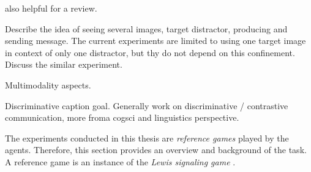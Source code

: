 \cite{lazaridou2018emergence} also helpful for a review.

Describe the idea of seeing several images, target distractor, producing and sending message.
The current experiments are limited to using one target image in context of only one distractor, but thy do not depend on this confinement.
Discuss the similar experiment. 

Multimodality aspects.

Discriminative caption goal. Generally work on discriminative / contrastive communication, more froma cogsci and linguistics perspective.

The experiments conducted in this thesis are \textit{reference games} played by the agents. Therefore, this section provides an overview and background of the task. 
A reference game is an instance of the \textit{Lewis signaling game} . 